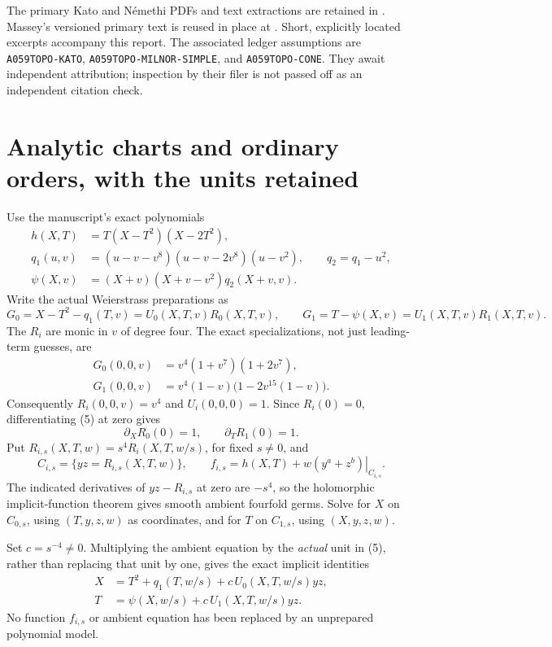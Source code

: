 \documentclass[11pt]{article}
\begin{document}
The primary Kato and N\'emethi PDFs and text extractions are retained
in . Massey's versioned
primary text is reused in place at
.
Short, explicitly located excerpts accompany this report.
The associated ledger assumptions are
\texttt{A059TOPO-KATO}, \texttt{A059TOPO-MILNOR-SIMPLE}, and
\texttt{A059TOPO-CONE}. They await independent attribution; inspection
by their filer is not passed off as an independent citation check.

\section{Analytic charts and ordinary orders, with the units retained}

Use the manuscript's exact polynomials
\[
\begin{split}
h(X,T)&=T(X-T^2)(X-2T^2),\\
q_1(u,v)&=(u-v-v^8)(u-v-2v^8)(u-v^2),\qquad q_2=q_1-u^2,\\
\psi(X,v)&=(X+v)(X+v-v^2)q_2(X+v,v).
\end{split}                                                       \tag{4}
\]
Write the actual Weierstrass preparations as
\[
G_0=X-T^2-q_1(T,v)=U_0(X,T,v)R_0(X,T,v),\qquad
G_1=T-\psi(X,v)=U_1(X,T,v)R_1(X,T,v).                              \tag{5}
\]
The \(R_i\) are monic in \(v\) of degree four.
The exact specializations, not just leading-term guesses, are
\[
\begin{split}
G_0(0,0,v)&=v^4(1+v^7)(1+2v^7),\\
G_1(0,0,v)&=v^4(1-v)\bigl(1-2v^{15}(1-v)\bigr).
\end{split}                                                       \tag{6}
\]
Consequently \(R_i(0,0,v)=v^4\) and \(U_i(0,0,0)=1\).
Since \(R_i(0)=0\), differentiating (5) at zero gives
\[
\partial_XR_0(0)=1,\qquad \partial_TR_1(0)=1.                      \tag{7}
\]
Put \(R_{i,s}(X,T,w)=s^4R_i(X,T,w/s)\), for fixed \(s\ne0\), and
\[
C_{i,s}=\{yz=R_{i,s}(X,T,w)\},\qquad
f_{i,s}=\left.h(X,T)+w(y^a+z^b)\right|_{C_{i,s}}.
\]
The indicated derivatives of \(yz-R_{i,s}\) at zero are \(-s^4\),
so the holomorphic implicit-function theorem gives smooth ambient
fourfold germs. Solve for \(X\) on \(C_{0,s}\), using
\((T,y,z,w)\) as coordinates, and for \(T\) on \(C_{1,s}\), using
\((X,y,z,w)\).

Set \(c=s^{-4}\ne0\). Multiplying the ambient equation by the
\emph{actual} unit in (5), rather than replacing that unit by one,
gives the exact implicit identities
\[
\begin{split}
X&=T^2+q_1(T,w/s)+c\,U_0(X,T,w/s)yz,\\
T&=\psi(X,w/s)+c\,U_1(X,T,w/s)yz. 
\end{split}                                                       \tag{8}
\]
No function \(f_{i,s}\) or ambient equation has been replaced by an
unprepared polynomial model.
\end{document}

